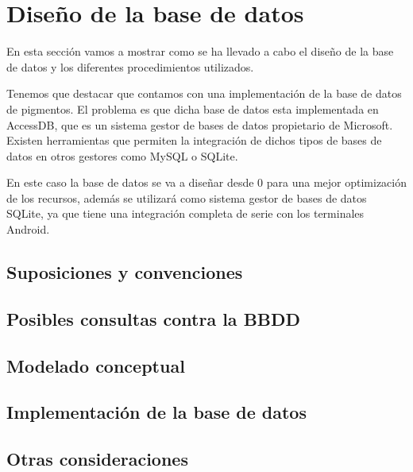 \section{Diseño de la base de datos}
\setlength{\parskip}{0.5cm}

En esta sección vamos a mostrar como se ha llevado a cabo el diseño de la base de datos y los diferentes procedimientos utilizados. 

Tenemos que destacar que contamos con una implementación de la base de datos de pigmentos. El problema es que dicha base de datos esta implementada en AccessDB, que es un sistema gestor de bases de datos propietario de Microsoft. Existen herramientas que permiten la integración de dichos tipos de bases de datos en otros gestores como MySQL o SQLite.

En este caso la base de datos se va a diseñar desde 0 para una mejor optimización de los recursos, además se utilizará como sistema gestor de bases de datos SQLite, ya que tiene una integración completa de serie con los terminales Android.

\subsection{Suposiciones y convenciones}


\subsection{Posibles consultas contra la BBDD}


\subsection{Modelado conceptual}


\subsection{Implementación de la base de datos}


\subsection{Otras consideraciones}

